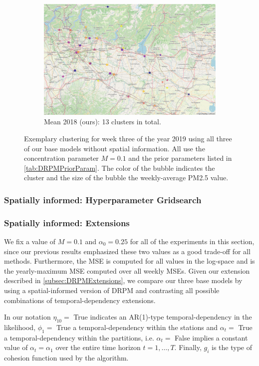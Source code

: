 \documentclass[12pt,a4paper]{article}
\begin{document}
\begin{figure}
\begin{subfigure}[b]{0.49\textwidth}
         \includegraphics[width=\textwidth]{./imgs/drpm/drpm_base_clustering_mean_prev_year.png}
         \caption{Mean 2018 (ours): 13 clusters in total.}
         \label{fig:DRPMMeanPreviousYear}
     \end{subfigure}
        \caption{Exemplary clustering for week three of the year 2019 using all three of
        our base models without spatial information. All use the concentration parameter
        $M=0.1$ and the prior parameters listed in \cref{tab:DRPMPriorParam}. The color of
        the bubble indicates the cluster and the size of the bubble the weekly-average PM2.5 value.}
        \label{fig:DRPMClusteringBaseModels}
\end{figure}

\subsubsection{Spatially informed: Hyperparameter Gridsearch}
\subsubsection{Spatially informed: Extensions}
We fix a value of $M= 0.1$ and $\alpha_0 = 0.25$ for all of the experiments in this section, since our previous results emphasized
these two values as a good trade-off for all methods. Furthermore, the MSE is computed for all values in the log-space and is the
yearly-maximum MSE computed over all weekly MSEs. Given our
extension described in \cref{subsec:DRPMExtensions}, we compare our three base models by using a spatial-informed version of
DRPM and contrasting all possible combinations of temporal-dependency extensions.

In our notation $\eta_{10} =$ True indicates an AR(1)-type temporal-dependency in the likelihood,
$\phi_1 =$ True a temporal-dependency within the stations and $\alpha_t = $ True a temporal-dependency within
the partitions, i.e. $\alpha_t = $ False implies a constant value of $\alpha_t = \alpha_1$ over the entire time horizon
$t = 1, \ldots, T$. Finally, $g_i$ is the type of cohesion function used by the algorithm.
\end{document}
